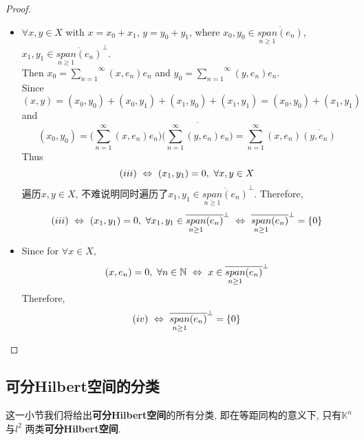 \begin{thm}
\begin{proof}
\begin{enumerate}
\begin{itemize}
					\item $\forall x , y \in X$ with $x = x_0 + x_1$, $y = y_0 + y_1$, where $x_0 , y_0 \in \overline{\underset{n \geq 1}{span} (e_n)}$, $x_1 , y_1 \in \overline{\underset{n \geq 1}{span} (e_n)}^{\perp}$. \\
					Then $x_0 = \overset{\infty}{\underset{n = 1}{\sum}} (x , e_n) e_n$ and $y_0 = \overset{\infty}{\underset{n = 1}{\sum}} (y , e_n) e_n$. \\
					Since
					\[ (x , y) = (x_0 , y_0) + (x_0 , y_1) + (x_1 , y_0) + (x_1 , y_1) = (x_0 , y_0) + (x_1 , y_1) \]
					and
					\[ (x_0 , y_0) = \Big( \sum_{n = 1}^{\infty} (x , e_n) e_n \Big) \overline{ \Big( \sum_{n = 1}^{\infty} (y , e_n) e_n \Big) } 
					= \sum_{n = 1}^{\infty} (x , e_n) \overline{(y , e_n)} \]
					Thus
					\[ (\rmnum{3}) \,\, \Leftrightarrow \,\, (x_1 , y_1) = 0 , \,\, \forall x , y \in X \]
					遍历$x , y \in X$, 不难说明同时遍历了$x_1 , y_1 \in \overline{\underset{n \geq 1}{span} (e_n)}^{\perp}$. Therefore, 
					\[ (\rmnum{3}) \,\, \Leftrightarrow \,\, 
					(x_1 , y_1) = 0 , \,\, \forall x_1 , y_1 \in \overline{\underset{n \geq 1}{span} (e_n)}^{\perp} \,\, \Leftrightarrow \,\, 
					\overline{\underset{n \geq 1}{span} (e_n)}^{\perp} = \{ 0 \} \]
					
					\newpage
					
					\item Since for $\forall x \in X$, 
					\[ (x , e_n) = 0 , \,\, \forall n \in \mathbb{N} \,\, \Leftrightarrow \,\, x \in \overline{\underset{n \geq 1}{span} (e_n)}^{\perp} \]
					Therefore, 
					\[ (\rmnum{4}) \,\, \Leftrightarrow \,\, \overline{\underset{n \geq 1}{span} (e_n)}^{\perp} = \{ 0 \} \]
				\end{itemize}
			\end{enumerate}
		\end{proof}
	\end{thm}

\newpage

\subsection{可分Hilbert空间的分类}
	这一小节我们将给出\textbf{可分Hilbert空间}的所有分类, 即在等距同构的意义下, 只有$\mathbb{K}^n$ 与$l^2$ 两类\textbf{可分Hilbert空间}. 
	
	\vspace{1em}
	
